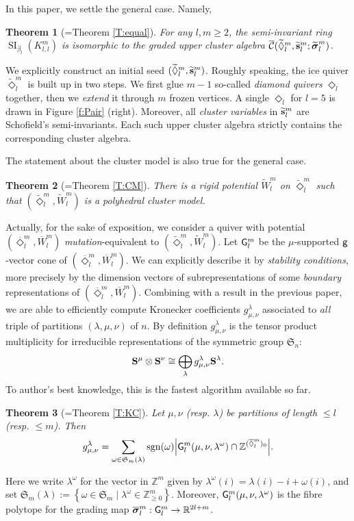 \documentclass{amsart}
\newtheorem{theorem}{Theorem}[section]
\theoremstyle{definition}
\theoremstyle{remark}
\numberwithin{equation}{section}
\DeclareMathOperator{\SI}{SI}
\newcommand{\op}[1]{\operatorname{#1}}
\newcommand{\mc}[1]{\mathcal{#1}}
\newcommand{\mb}[1]{\mathbb{#1}}
\newcommand{\mr}[1]{{\sf #1}}%
\newcommand{\mf}[1]{\mathfrak{#1}}
\renewcommand{\b}[1]{\bold{#1}}
\newcommand{\bs}[1]{\boldsymbol{#1}}
\newcommand{\br}[1]{\overline{#1}}
\newcommand{\wtd}[1]{\widetilde{#1}}
\newcommand{\g}{{\sf g}}
\renewcommand{\S}{{\bf S}}
\newcommand{\uca}{\br{\mc{C}}}
\newcommand{\kllm}{{K_{l,l}^m}}
\newcommand{\bl}{{\beta_l}}
\begin{document}
In this paper, we settle the general case. Namely, %
\begin{theorem}[=Theorem \ref{T:equal}] For any $l,m\geq 2$, the semi-invariant ring $\SI_\bl(\kllm)$ is isomorphic to the graded upper cluster algebra $\uca(\wtd{\Diamond}_l^m,\wtd{\b{s}}_l^m; \wtd{\bs{\sigma}}_l^m)$.
\end{theorem}
\noindent We explicitly construct an initial seed $(\wtd{\Diamond}_l^m,\wtd{\b{s}}_l^m)$.
Roughly speaking, the ice quiver $\wtd{\Diamond}_l^m$ is built up in two steps.
We first glue $m-1$ so-called {\em diamond quivers} $\Diamond_l$ together, then we {\em extend} it through $m$ frozen vertices.
A single $\Diamond_l$ for $l=5$ is drawn in Figure \ref{f:Pair} (right).  
Moreover, all {\em cluster variables} in $\wtd{\b{s}}_l^m$ are Schofield's semi-invariants.
Each such upper cluster algebra strictly contains the corresponding cluster algebra. 

The statement about the cluster model is also true for the general case.
\begin{theorem}[=Theorem \ref{T:CM}] There is a rigid potential $\wtd{W}_l^m$ on $\wtd{\Diamond}_l^m$ such that $(\wtd{\Diamond}_l^m,\wtd{W}_l^m)$ is a polyhedral cluster model.
\end{theorem}
Actually, for the sake of exposition, we consider a quiver with potential $(\br{\Diamond}_l^m,\br{W}_l^m)$ {\em mutation}-equivalent to $(\wtd{\Diamond}_l^m,\wtd{W}_l^m)$.
Let $\mr{G}_l^m$ be the $\mu$-supported $\g$-vector cone of $(\br{\Diamond}_l^m,\br{W}_l^m)$. 
We can explicitly describe it by {\em stability conditions}, more precisely by the dimension vectors of subrepresentations of some {\em boundary} representations of $(\br{\Diamond}_l^m,\br{W}_l^m)$.
Combining with a result in the previous paper, we are able to efficiently compute Kronecker coefficients $g_{\mu,\nu}^{\lambda}$ associated to {\em all} triple of partitions $(\lambda,\mu,\nu)$ of $n$. 
By definition $g_{\mu,\nu}^\lambda$ is the tensor product multiplicity for irreducible representations of the symmetric group $\mf{S}_n$:
$$\S^\mu \otimes \S^\nu \cong \bigoplus_\lambda g_{\mu,\nu}^\lambda \S^\lambda.$$
To author's best knowledge, this is the fastest algorithm available so far.
\begin{theorem}[=Theorem \ref{T:KC}] Let $\mu,\nu$ (resp. $\lambda$) be partitions of length $\leq l$ (resp. $\leq m$). Then
	$$g_{\mu,\nu}^\lambda = \sum_{\omega\in \mf{S}_m(\lambda)} \op{sgn}(\omega) \Big|\mr{G}_l^m(\mu,\nu,\lambda^\omega)\cap \mb{Z}^{(\br{\Diamond}_l^m)_0}\Big|.$$
\end{theorem}
\noindent Here we write $\lambda^\omega$ for the vector in $\mb{Z}^m$ given by $\lambda^\omega(i)= \lambda(i)-i+\omega(i)$,
and set $\mf{S}_m(\lambda):=\left\{\omega\in \mf{S}_m \mid \lambda^\omega\in \mb{Z}_{\geq 0}^m \right\}$.
Moreover, $\mr{G}_l^m(\mu,\nu,\lambda^\omega)$ is the fibre polytope for the grading map $\br{\bs{\sigma}}_l^m : \mr{G}_l^m\to \mb{R}^{2l+m}$. 
\end{document}
